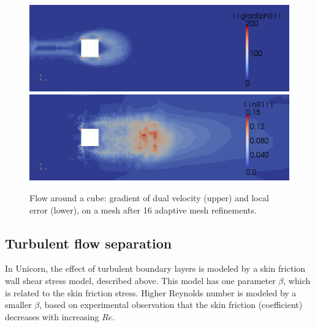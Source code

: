 \begin{figure}
  \centering
  \includegraphics[width=\largefig]{chapters/hoffman-1/png/fig3a.png}
  \medskip
  \includegraphics[width=\largefig]{chapters/hoffman-1/png/fig3b.png}
  \caption{Flow around a cube: gradient of dual velocity (upper) and local
    error (lower), on a mesh after 16 adaptive mesh refinements.}
  \label{hoffman-1:fig:cube3}
\end{figure}

\subsection{Turbulent flow separation}

In Unicorn, the effect of turbulent boundary layers is modeled by a
skin friction wall shear stress model, described above. This model has
one parameter $\beta$, which is related to the skin friction stress.
Higher Reynolds number is modeled by a smaller $\beta$, based on
experimental observation that the skin friction (coefficient)
decreases with increasing $Re$.

